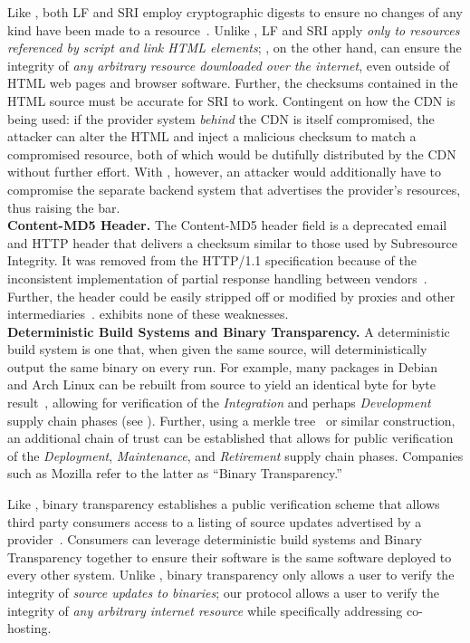 Like \SYSTEM{}, both LF and SRI employ cryptographic digests to ensure no
changes of any kind have been made to a resource~\cite{SRI}. Unlike \SYSTEM{},
LF and SRI apply \emph{only to resources referenced by script and link HTML
elements}; \SYSTEM{}, on the other hand, can ensure the integrity of \emph{any
arbitrary resource downloaded over the internet}, even outside of HTML web pages
and browser software. Further, the checksums contained in the HTML source must
be accurate for SRI to work. Contingent on how the CDN is being used: if the
provider system \emph{behind} the CDN is itself compromised, the attacker can
alter the HTML and inject a malicious checksum to match a compromised resource,
both of which would be dutifully distributed by the CDN without further effort.
With \SYSTEM{}, however, an attacker would additionally have to compromise the
separate backend system that advertises the provider's resources, thus raising
the bar. \\

\noindent\textbf{Content-MD5 Header.} The Content-MD5 header field is a
deprecated email and HTTP header that delivers a checksum similar to those used
by Subresource Integrity. It was removed from the HTTP/1.1 specification because
of the inconsistent implementation of partial response handling between
vendors~\cite{HTTP1.1}. Further, the header could be easily stripped off or
modified by proxies and other intermediaries~\cite{MD5Header}. \SYSTEM{}
exhibits none of these weaknesses. \\

\noindent\textbf{Deterministic Build Systems and Binary Transparency.} A
deterministic build system is one that, when given the same source, will
deterministically output the same binary on every run. For example, many
packages in Debian~\cite{ReproBuildsDebian} and Arch Linux can be rebuilt from
source to yield an identical byte for byte result~\cite{ReproBuilds}, allowing
for verification of the \emph{Integration} and perhaps \emph{Development} supply
chain phases (see ). Further, using a merkle
tree~\cite{MerkleTree} or similar construction, an additional chain of trust can
be established that allows for public verification of the \emph{Deployment},
\emph{Maintenance}, and \emph{Retirement} supply chain phases. Companies such as
Mozilla refer to the latter as ``Binary Transparency.''

Like \SYSTEM{}, binary transparency establishes a public verification scheme
that allows third party consumers access to a listing of source updates
advertised by a provider~\cite{BinaryTransparency}. Consumers can leverage
deterministic build systems and Binary Transparency together to ensure their
software is the same software deployed to every other system. Unlike \SYSTEM{},
binary transparency only allows a user to verify the integrity of \emph{source
updates to binaries}; our protocol allows a user to verify the integrity of
\emph{any arbitrary internet resource} while specifically addressing co-hosting.
\\

